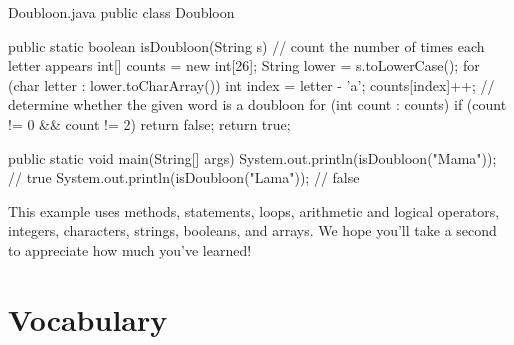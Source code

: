 \begin{trinket}{Doubloon.java}
public class Doubloon {

    public static boolean isDoubloon(String s) {
        // count the number of times each letter appears
        int[] counts = new int[26];
        String lower = s.toLowerCase();
        for (char letter : lower.toCharArray()) {
            int index = letter - 'a';
            counts[index]++;
        }
        // determine whether the given word is a doubloon
        for (int count : counts) {
            if (count != 0 && count != 2) {
                return false;
            }
        }
        return true;
    }

    public static void main(String[] args) {
        System.out.println(isDoubloon("Mama"));  // true
        System.out.println(isDoubloon("Lama"));  // false
    }
}
\end{trinket}


This example uses methods,  statements,  loops, arithmetic and logical operators, integers, characters, strings, booleans, and arrays.
We hope you'll take a second to appreciate how much you've learned!


\section{Vocabulary}

